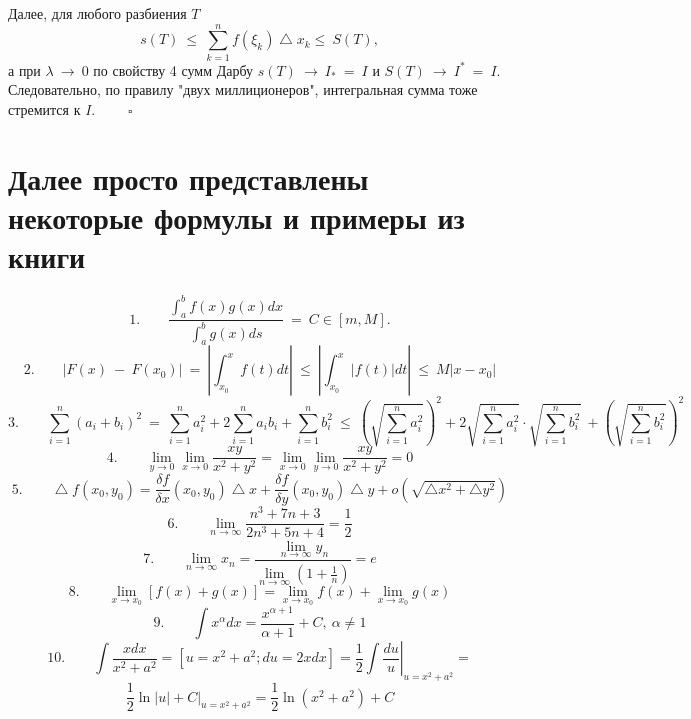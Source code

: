\documentclass[a4paper,12pt]{article}
\begin{document}
Далее, для любого разбиения $T$
\[s(T)\ \le\ \sum_{k=1}^n f(\xi_{k}) \bigtriangleup x_{k} \le\ S(T),\]
а при $\lambda\ \to\ 0$ по свойству 4 сумм Дарбу $s(T)\ \to\ I_{*}\ =\ I$ и $S(T)\ \to\ I^*\ =\ I.$ Следовательно, по правилу "двух миллиционеров", интегральная сумма тоже стремится к $I.$ $\qquad \square$
\newpage
\section{Далее просто представлены некоторые формулы и примеры из книги}
\[1. \qquad \frac{\int_a^b f(x)g(x)dx}{\int_a^b g(x)ds}\ =\ C \in [m, M]. \]
\[2. \qquad \left| F(x)\ -\ F(x_{0}) \right|\ =\ \left| \int_{x_0}^x f(t)dt \right|\ \le\ \left| \int_{x_0}^x \left| f(t) \right|dt  \right|\ \le\ M \left| x - x_{0} \right|  \]
\[3. \qquad \sum_{i=1}^n (a_{i} + b_{i})^2\ =\ \sum_{i=1}^n a_i^2 + 2 \sum_{i=1}^n a_i b_i + \sum_{i=1}^n b^2_i\ \le\ \left( \sqrt{\sum_{i=1}^n a_i^2} \right)^2 + 2 \sqrt{\sum_{i=1}^n a_i^2} \cdot \sqrt{\sum_{i=1}^n b_i^2}\ + \left( \sqrt{\sum_{i=1}^n b_i^2} \right)^2  \]
\[4. \qquad \lim_{y \to 0} \lim_{x \to 0} \frac{xy}{x^2 + y^2} = \lim_{x \to 0} \lim_{y \to 0} \frac{xy}{x^2 + y^2} = 0 \]
\[5. \qquad \bigtriangleup f(x_0, y_0) = \frac{\delta f}{\delta x} (x_0, y_0) \bigtriangleup x + \frac{\delta f}{\delta y} (x_0, y_0) \bigtriangleup y + o(\sqrt{\bigtriangleup x^2 + \bigtriangleup y^2})  \]
\[6. \qquad \lim_{n \to \infty} \frac{n^3 + 7n + 3}{2n^3 + 5n + 4} = \frac{1}{2} \]
\[7. \qquad \lim_{n \to \infty} x_n = \frac{\overset{}{\underset{n \to \infty}{\lim} y_n}}{\overset{}{\underset{n \to \infty}{\lim} (1 + \frac{1}{n})}} = e \]
\[8. \qquad \lim_{x \to x_0} \left[ f(x) + g(x) \right] = \lim_{x \to x_0} f(x) + \lim_{x \to x_0} g(x)  \]
\[9. \qquad \int x^{\alpha} dx = \frac{x^{\alpha + 1}}{\alpha + 1} + C,\ \alpha \ne 1 \]
\[10. \qquad \int \frac{xdx}{x^2 + a^2} = \left[ u = x^2 + a^2; du = 2xdx \right] = \frac{1}{2} \int \left. \frac{du}{u}  \right|_{u=x^2 + a^2} = \]
\[ \frac{1}{2} \ln{\left| u \right|} + \left. C \right|_{u=x^2 + a^2} = \frac{1}{2} \ln(x^2 + a^2) + C \]
\end{document}
